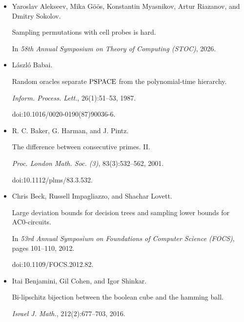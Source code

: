 \begin{itemize}


\item[] 
[1]

Yaroslav Alekseev, Mika Göös, Konstantin Myasnikov, Artur Riazanov, and
Dmitry Sokolov.


Sampling permutations with cell probes is hard.


In \emph{58th Annual Symposium on Theory of Computing (STOC)}, 2026.





\item[] 
[2]

László Babai.


Random oracles separate ${\rm PSPACE}$ from the polynomial-time
hierarchy.


\emph{Inform. Process. Lett.}, 26(1):51–53, 1987.


doi:10.1016/0020-0190(87)90036-6.





\item[] 
[3]

R. C. Baker, G. Harman, and J. Pintz.


The difference between consecutive primes. II.


\emph{Proc. London Math. Soc. (3)}, 83(3):532–562, 2001.


doi:10.1112/plms/83.3.532.





\item[] 
[4]

Chris Beck, Russell Impagliazzo, and Shachar Lovett.


Large deviation bounds for decision trees and sampling lower bounds
for AC0-circuits.


In \emph{53rd Annual Symposium on Foundations of Computer Science
(FOCS)}, pages 101–110, 2012.


doi:10.1109/FOCS.2012.82.





\item[] 
[5]

Itai Benjamini, Gil Cohen, and Igor Shinkar.


Bi-lipschitz bijection between the boolean cube and the hamming ball.


\emph{Israel J. Math.}, 212(2):677–703, 2016.



\end{itemize}
